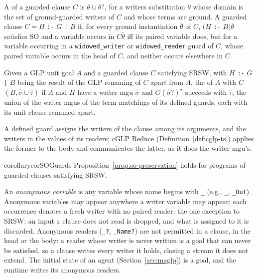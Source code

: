\begin{definition}
\label{def:guarded-srsw}
A  of a guarded clause $C$ is $\theta \cup \theta?$, for a writers substitution $\theta$ whose domain is the set of ground-guarded writers of $C$ and whose terms are ground. A guarded clause $C = H$ \verb|:-| $G$ \verb"|" $B$  if, for every ground instantiation $\bar\theta$ of $C$, $(H$ \verb|:-| $B)\bar\theta$ satisfies SO and a variable occurs in $C\bar\theta$ iff its paired variable does, but for a variable occurring in a \verb|widowed_writer| or \verb|widowed_reader| guard of $C$, whose paired variable occurs in the head of $C$, and neither occurs elsewhere in $C$.
\end{definition}

\begin{definition}
\label{def:guarded-reduction}
Given a GLP unit goal $A$ and a guarded clause $C$ satisfying SRSW, with $H$ \verb|:-| $G$ \verb"|" $B$ being the result of the GLP renaming of $C$ apart from $A$, the  of $A$ with $C$  $(B, \hat\sigma \cup \hat\tau)$ if $A$ and $H$ have a writer mgu $\hat\sigma$ and $G(\hat\sigma?)^\star$ succeeds with $\hat\tau$, the union of the writer mgus of the term matchings of its defined guards, each with its unit clause renamed apart.
\end{definition}

A defined guard assigns the writers of the clause among its arguments, and the writers in the values of its readers; cGLP Reduce (Definition~\ref{def:cglp-ts}) applies the former to the body and communicates the latter, as it does the writer mgu's.

\begin{restatable}{corollary}{corSOGuards}
\label{cor:so-guards}
Proposition~\ref{prop:so-preservation} holds for programs of guarded clauses satisfying SRSW.
\end{restatable}

\begin{remark}
\label{rem:anonymous-variables}
An \emph{anonymous variable} is any variable whose name begins with \verb|_| (e.g., \verb|_|, \verb|_Out|). Anonymous variables may appear anywhere a writer variable may appear; each occurrence denotes a fresh writer with no paired reader, the one exception to SRSW: an input a clause does not read is dropped, and what is assigned to it is discarded. Anonymous readers (\verb|_?|, \verb|_Name?|) are not permitted in a clause, in the head or the body: a reader whose writer is never written is a goal that can never be satisfied, so a clause writes every writer it holds, closing a stream it does not extend.  The initial state of an agent (Section~\ref{sec:maglp}) is a goal, and the runtime writes its anonymous readers.
\end{remark}



